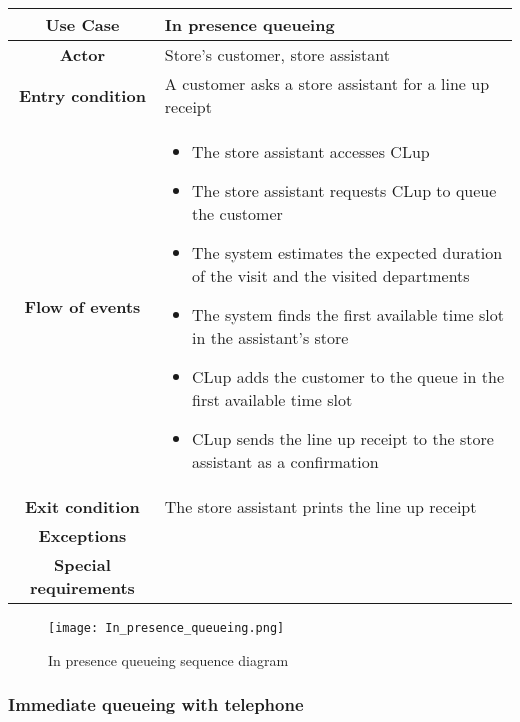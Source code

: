 \documentclass[../../main.tex]{subfiles}
\begin{document}
      \begin{table}[H]
        \centering
          \begin{tabular}{c m{}}
          \hline
          \textbf{Use Case} & In presence queueing\\ \hline
          \textbf{Actor} & Store's customer, store assistant\\ \hline
          \textbf{Entry condition} & A customer asks a store assistant for a line up receipt\\  \hline
          \textbf{Flow of events} & \begin{itemize}
                                      \item The store assistant accesses CLup
                                      \item The store assistant requests CLup to queue the customer
                                      \item The system estimates the expected duration of the visit and the visited departments
                                      \item The system finds the first available time slot in the assistant's store
                                      \item CLup adds the customer to the queue in the first available time slot
                                      \item CLup sends the line up receipt to the store assistant as a confirmation
                                    \end{itemize}\\ \hline
          \textbf{Exit condition} & The store assistant prints the line up receipt \\ \hline
          \textbf{Exceptions} & \\ \hline
          \textbf{Special requirements} &\\ \hline
          \end{tabular}
      \end{table}

      \begin{figure}[H]
        \centering
        \texttt{[image: In\_presence\_queueing.png]}
        \caption{In presence queueing sequence diagram}
      \end{figure}


      \subsubsection{Immediate queueing with telephone}
\end{document}
